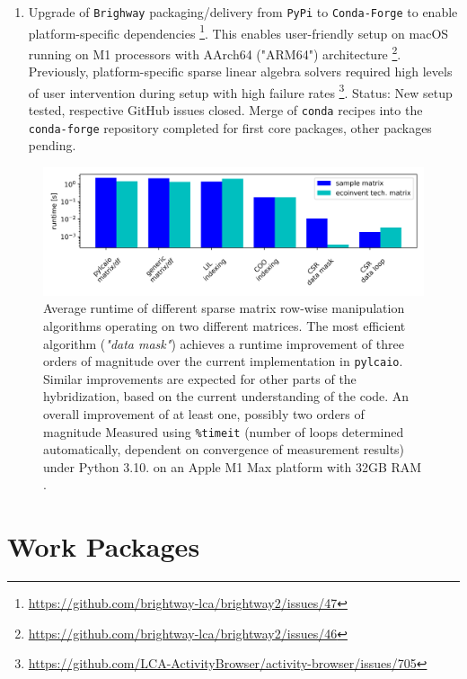 \documentclass{article}
\begin{document}
\begin{enumerate}
        \item
            Upgrade of \texttt{Brighway} packaging/delivery from \texttt{PyPi} to \texttt{Conda-Forge} to enable platform-specific dependencies \footnote{\url{https://github.com/brightway-lca/brightway2/issues/47}}. This enables user-friendly setup on macOS running on M1 processors with AArch64 ("ARM64") architecture \footnote{\url{https://github.com/brightway-lca/brightway2/issues/46}}. Previously, platform-specific sparse linear algebra solvers required high levels of user intervention during setup with high failure rates \footnote{\url{https://github.com/LCA-ActivityBrowser/activity-browser/issues/705}}. Status: New setup tested, respective GitHub issues closed. Merge of \texttt{conda} recipes into the \texttt{conda-forge} repository completed for first core packages, other packages pending.
    \end{enumerate}

\begin{figure}[h!]
	\centering
	\includegraphics[width=\textwidth]{figures/performance.png}
	\caption{Average runtime of different sparse matrix row-wise manipulation algorithms operating on two different matrices. The most efficient algorithm (\textit{"data mask"}) achieves a runtime improvement of three orders of magnitude over the current implementation in \texttt{pylcaio}. Similar improvements are expected for other parts of the hybridization, based on the current understanding of the code. An overall improvement of at least one, possibly two orders of magnitude Measured using \texttt{\%timeit} (number of loops determined automatically, dependent on convergence of measurement results) under Python 3.10. on an Apple M1 Max platform with 32GB RAM \cite{weinold_github_2022}.}
	\label{fig:performance}
\end{figure}

\newpage
\section{Work Packages}
\end{document}
